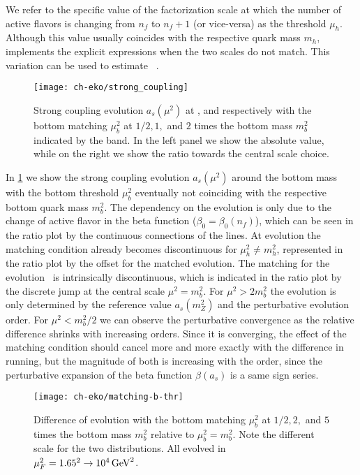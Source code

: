 We refer to the specific value of the factorization scale at which the number
of active flavors is changing from $n_f$ to $n_f+1$ (or vice-versa) as the
threshold $\mu_h$. Although this value usually coincides with the respective
quark mass $m_h$, \eko{} implements the explicit expressions when the two
scales do not match. This variation can be used to estimate \mhou{}~\cite{AbdulKhalek:2019ihb}.

\begin{figure}
    \centering
    \texttt{[image: ch-eko/strong\_coupling]}
    \caption{Strong coupling evolution $a_s(\mu^2)$ at \lo{},
    \nlo{} and \nnlo{}
    respectively with the bottom matching $\mu_b^2$ at $1/2, 1,$ and $2$ times the
    bottom mass $m_b^2$ indicated by the band. In the left panel we show the absolute
    value, while on the right we show the ratio towards the central scale choice.
     \label{fig:asmatching}}
\end{figure}

In \cref{fig:asmatching} we show the strong coupling evolution $a_s(\mu^2)$
around the bottom mass with the bottom threshold $\mu_b^2$ eventually not coinciding
with the respective bottom quark mass $m_b^2$.
The dependency on the \lo{} evolution is only due to the change of active
flavor in the beta function ($\beta_0 = \beta_0(n_f)$), which can be seen in
the ratio plot by the continuous connections of the lines.
At \nlo{} evolution the matching condition already becomes discontinuous for
$\mu_h^2 \neq m_h^2$, represented in the ratio plot by the offset for the
matched evolution. 
The matching for the \nnlo{} evolution~\cite{Chetyrkin:2005ia,Schroder:2005hy}
is intrinsically discontinuous, which is indicated in the ratio plot by the
discrete jump at the central scale $\mu^2 = m_b^2$.
For $\mu^2 > 2m_b^2$ the evolution is only determined by the reference value
$a_s(m_Z^2)$ and the perturbative evolution order.
For $\mu^2 < m_b^2/2$ we can observe the perturbative convergence as the
relative difference shrinks with increasing orders.
Since it is converging, the effect of the matching condition should cancel more
and more exactly with the difference in running, but the magnitude of both is
increasing with the order, since the perturbative expansion of the beta
function $\beta(a_s)$ is a same sign series.

\begin{figure}
    \centering
    \texttt{[image: ch-eko/matching-b-thr]}
    \caption{Difference of \pdf{} evolution with the bottom matching $\mu_b^2$ at $1/2, 2,$ and
        $5$ times the bottom mass $m_b^2$ relative to $\mu_b^2 = m_b^2$. Note
        the different scale for the two distributions.  All evolved in
        $\muF^2=\SI[parse-numbers=false]{1.65^2\to 10^4}{\GeV^2}$.}
    \label{fig:pdfmatching}
\end{figure}

